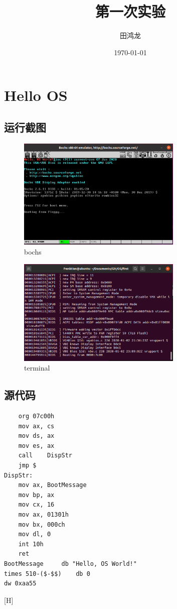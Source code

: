 \documentclass{article}
\title{第一次实验}
\author{田鸿龙}
\date{\today}
\begin{document}
\maketitle
\section{Hello OS}
\subsection{运行截图}
\begin{figure}[H]
    \centering
    \includegraphics[width=0.7\textwidth]{bochs}
    \caption{bochs}
\end{figure}
\begin{figure}[H]
    \centering
    \includegraphics[width=0.7\textwidth]{terminal}
    \caption{terminal}
\end{figure}
\subsection{源代码}
\begin{lstlisting}
    org 07c00h
	mov ax, cs
	mov ds, ax
	mov es, ax
	call	DispStr
	jmp $
DispStr:
	mov ax, BootMessage
	mov bp, ax
	mov cx, 16
	mov ax, 01301h
	mov bx, 000ch
	mov dl, 0
	int 10h
	ret
BootMessage		db "Hello, OS World!"
times 510-($-$$)	db 0
dw 0xaa55
\end{lstlisting}[H]
\end{document}
